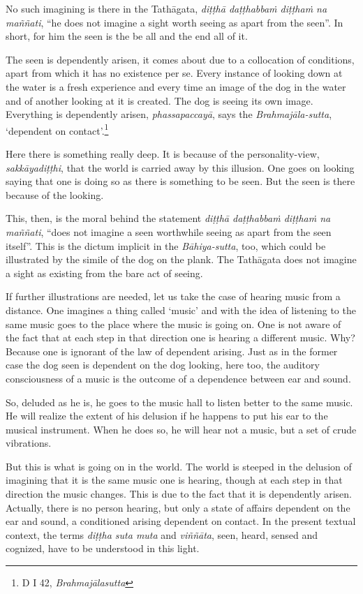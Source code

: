 No such imagining is there in the Tathāgata, \emph{diṭṭhā daṭṭhabbaṁ diṭṭhaṁ na maññati}, ``he does not imagine a sight worth seeing as apart from the seen''. In short, for him the seen is the be all and the end all of it.

The seen is dependently arisen, it comes about due to a collocation of conditions, apart from which it has no existence per se. Every instance of looking down at the water is a fresh experience and every time an image of the dog in the water and of another looking at it is created. The dog is seeing its own image. Everything is dependently arisen, \emph{phassapaccayā}, says the \emph{Brahmajāla-sutta}, `dependent on contact'.\footnote{D I 42, \emph{Brahmajālasutta}}

Here there is something really deep. It is because of the personality-view, \emph{sakkāyadiṭṭhi}, that the world is carried away by this illusion. One goes on looking saying that one is doing so as there is something to be seen. But the seen is there because of the looking.

This, then, is the moral behind the statement \emph{diṭṭhā daṭṭhabbaṁ diṭṭhaṁ na maññati}, ``does not imagine a seen worthwhile seeing as apart from the seen itself''. This is the dictum implicit in the \emph{Bāhiya-sutta}, too, which could be illustrated by the simile of the dog on the plank. The Tathāgata does not imagine a sight as existing from the bare act of seeing.

If further illustrations are needed, let us take the case of hearing music from a distance. One imagines a thing called `music' and with the idea of listening to the same music goes to the place where the music is going on. One is not aware of the fact that at each step in that direction one is hearing a different music. Why? Because one is ignorant of the law of dependent arising. Just as in the former case the dog seen is dependent on the dog looking, here too, the auditory consciousness of a music is the outcome of a dependence between ear and sound.

So, deluded as he is, he goes to the music hall to listen better to the same music. He will realize the extent of his delusion if he happens to put his ear to the musical instrument. When he does so, he will hear not a music, but a set of crude vibrations.

But this is what is going on in the world. The world is steeped in the delusion of imagining that it is the same music one is hearing, though at each step in that direction the music changes. This is due to the fact that it is dependently arisen. Actually, there is no person hearing, but only a state of affairs dependent on the ear and sound, a conditioned arising dependent on contact. In the present textual context, the terms \emph{diṭṭha suta muta} and \emph{viññāta}, seen, heard, sensed and cognized, have to be understood in this light.

